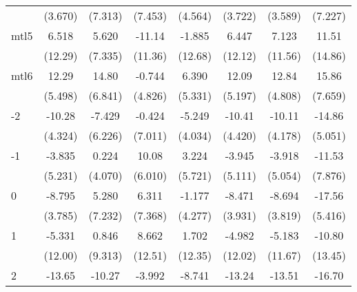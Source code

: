 \documentclass{article}
\begin{document}
{\begin{longtable}{l*{7}{c}}
                &  (3.670)         &  (7.313)         &  (7.453)         &  (4.564)         &  (3.722)         &  (3.589)         &  (7.227)         \\
mtl5            &    6.518         &    5.620         &   -11.14         &   -1.885         &    6.447         &    7.123         &    11.51         \\
                &  (12.29)         &  (7.335)         &  (11.36)         &  (12.68)         &  (12.12)         &  (11.56)         &  (14.86)         \\
mtl6            &    12.29\sym{*}  &    14.80\sym{*}  &   -0.744         &    6.390         &    12.09\sym{*}  &    12.84\sym{*}  &    15.86         \\
                &  (5.498)         &  (6.841)         &  (4.826)         &  (5.331)         &  (5.197)         &  (4.808)         &  (7.659)         \\
-2              &   -10.28\sym{*}  &   -7.429         &   -0.424         &   -5.249         &   -10.41\sym{*}  &   -10.11\sym{*}  &   -14.86\sym{*}  \\
                &  (4.324)         &  (6.226)         &  (7.011)         &  (4.034)         &  (4.420)         &  (4.178)         &  (5.051)         \\
-1              &   -3.835         &    0.224         &    10.08         &    3.224         &   -3.945         &   -3.918         &   -11.53         \\
                &  (5.231)         &  (4.070)         &  (6.010)         &  (5.721)         &  (5.111)         &  (5.054)         &  (7.876)         \\
0               &   -8.795\sym{*}  &    5.280         &    6.311         &   -1.177         &   -8.471\sym{*}  &   -8.694\sym{*}  &   -17.56\sym{**} \\
                &  (3.785)         &  (7.232)         &  (7.368)         &  (4.277)         &  (3.931)         &  (3.819)         &  (5.416)         \\
1               &   -5.331         &    0.846         &    8.662         &    1.702         &   -4.982         &   -5.183         &   -10.80         \\
                &  (12.00)         &  (9.313)         &  (12.51)         &  (12.35)         &  (12.02)         &  (11.67)         &  (13.45)         \\
2               &   -13.65\sym{**} &   -10.27         &   -3.992         &   -8.741         &   -13.24\sym{**} &   -13.51\sym{**} &   -16.70\sym{*}  \\

\end{longtable}}
\end{document}
